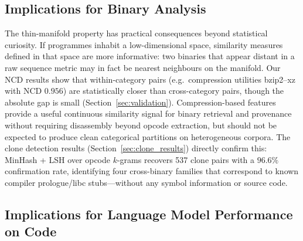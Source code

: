\documentclass[10pt,twocolumn]{article}
\begin{document}
\subsection{Implications for Binary Analysis}

The thin-manifold property has practical consequences beyond statistical
curiosity.  If programmes inhabit a low-dimensional space, similarity measures
defined in that space are more informative: two binaries that appear distant in
a raw sequence metric may in fact be nearest neighbours on the manifold.  Our
NCD results show that within-category pairs (e.g.\ compression
utilities bzip2--xz with NCD $0.956$) are statistically closer than
cross-category pairs, though the absolute gap is small (Section~\ref{sec:validation}).
Compression-based features provide a useful continuous similarity signal for
binary retrieval and provenance without requiring disassembly beyond opcode
extraction, but should not be expected to produce clean categorical partitions
on heterogeneous corpora.  The clone detection results
(Section~\ref{sec:clone_results}) directly confirm this: MinHash + LSH over
opcode $k$-grams recovers 537 clone pairs with a $96.6\%$ confirmation rate,
identifying four cross-binary families that correspond to known compiler
prologue/libc stubs---without any symbol information or source code.

\subsection{Implications for Language Model Performance on Code}
\end{document}
